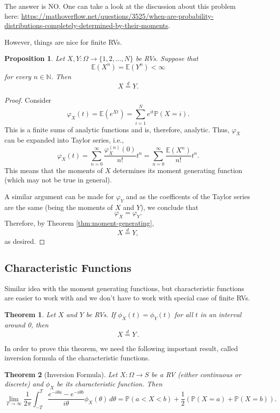 \documentclass[
  openany]{book}
\newtheorem{theorem}{Theorem}[chapter]
\newtheorem{proposition}{Proposition}[chapter]
\theoremstyle{definition}
\theoremstyle{definition}
\theoremstyle{definition}
\theoremstyle{definition}
\theoremstyle{remark}
\begin{document}
The answer is NO. One can take a look at the discussion about this problem here:
\url{https://mathoverflow.net/questions/3525/when-are-probability-distributions-completely-determined-by-their-moments}.

However, things are nice for finite RVs.

\begin{proposition}
Let \(X,Y: \Omega \to \{1,2, \dots, N\}\) be RVs. Suppose that
\[ \mathbb{E}(X^n) = \mathbb{E}(Y^n) < \infty\]
for every \(n\in \mathbb{N}\). Then
\[ X \stackrel{d}{=}Y .\]
\end{proposition}

\begin{proof}
Consider
\[ \varphi_X(t) = \mathbb{E}(e^{Xt}) = \sum_{i = 1}^N e^{it} \mathbb{P}( X = i). \]
This is a finite sums of analytic functions and is, therefore, analytic.
Thus, \(\varphi_X\) can be expanded into Taylor series, i.e.,
\[ \varphi_X(t)  = \sum_{n=0}^\infty \frac{\varphi_X^{(n)}(0)}{n!} t^n 
 = \sum_{n=0}^\infty \frac{\mathbb{E}(X^n)}{n!} t^n.\]
This means that the moments of \(X\) determines its moment generating function
(which may not be true in general).

A similar argument can be made for \(\varphi_Y\) and as the coefficents of the
Taylor series are the same (being the moments of \(X\) and \(Y\)), we conclude
that
\[\varphi_X = \varphi_Y.\]
Therefore,
by Theorem \ref{thm:moment-generating},
\[ X \stackrel{d}{=}Y, \]
as desired.
\end{proof}

\hypertarget{characteristic-functions}{%
\subsection{Characteristic Functions}\label{characteristic-functions}}

Similar idea with the moment generating functions, but
characteristic functions are easier to work with and we don't have to
work with special case of finite RVs.

\begin{theorem}
Let \(X\) and \(Y\) be RVs. If \(\phi_X(t) = \phi_Y(t)\) for all \(t\) in an interval around 0, then
\[ X  \stackrel{d}{=}Y \,.\]
\end{theorem}

In order to prove this theorem, we need the following important result, called
inversion formula of the characteristic functions.

\begin{theorem}[Inversion Formula]
Let \(X:\Omega \to S\) be a RV (either continuous or discrete)
and \(\phi_X\) be its characteristic function.
Then
\[  \lim_{T \to \infty} \frac{1}{2\pi}\int_{-T}^T \frac{e^{-i\theta a} 
- e^{-i\theta b}}{i\theta} \phi_X(\theta) \, d\theta
= \mathbb{P}( a < X < b) + \frac{1}{2} \left( \mathbb{P}(X = a) + \mathbb{P}(X = b)  \right). \]
\end{theorem}
\end{document}
